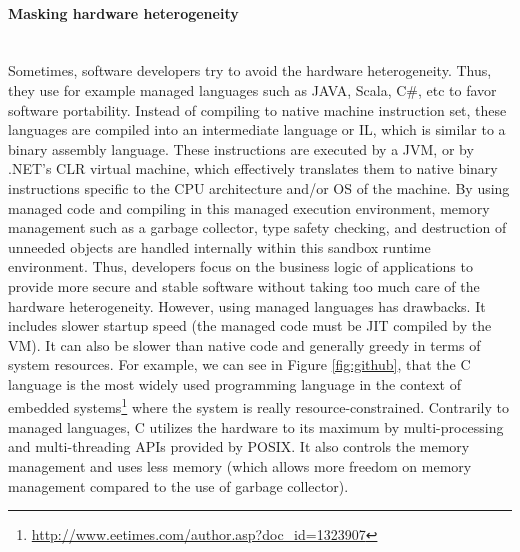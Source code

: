 \paragraph{Masking hardware heterogeneity}~\\ 
Sometimes, software developers try to avoid the hardware heterogeneity. Thus, they use for example managed languages such as JAVA, Scala, C\#, etc to favor software portability. Instead of compiling to native machine instruction set, these languages are compiled into an intermediate language or IL, which is similar to a binary assembly language. These instructions are executed by a JVM, or by .NET's CLR virtual machine, which effectively translates them to native binary instructions specific to the CPU architecture and/or OS of the machine.
By using managed code and compiling in this managed execution environment, memory management such as a garbage collector, type safety checking, and destruction of unneeded objects are handled internally within this sandbox runtime environment. Thus, developers focus on the business logic of applications to provide more secure and stable software without taking too much care of the hardware heterogeneity.
However, using managed languages has drawbacks. It includes slower startup speed (the managed code must be JIT compiled by the VM). It can also be slower than native code and generally greedy in terms of system resources. 
For example, we can see in Figure \ref{fig:github}, that the C language is the most widely used programming language in the context of embedded systems\footnote{\url{http://www.eetimes.com/author.asp?doc_id=1323907}} where the system is really resource-constrained. Contrarily to managed languages, C utilizes the hardware to its maximum by multi-processing and multi-threading APIs provided by POSIX. It also controls the memory management and uses less memory (which allows more freedom on memory management compared to the use of garbage collector).   



